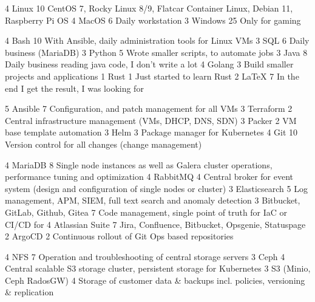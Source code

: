 \documentclass[11pt,a4paper,sans,final]{moderncv}
\begin{document}
							{4}	{Linux}								{10}	{CentOS 7, Rocky Linux 8/9, Flatcar Container Linux, Debian 11, Raspberry Pi OS}
		\cvskillentry		{}						{4}	{MacOS}								{6}		{Daily workstation}
		\cvskillentry		{}						{3}	{Windows}							{25}	{Only for gaming}
		
						{4}	{Bash}								{10}	{With Ansible, daily administration tools for Linux VMs}
		\cvskillentry		{}						{3}	{SQL}								{6}		{Daily business (MariaDB)}
		\cvskillentry		{}						{3}	{Python}							{5}		{Wrote smaller scripts, to automate jobs}
		\cvskillentry		{}						{3}	{Java}								{8}		{Daily business reading java code, I don't write a lot}
		\cvskillentry		{}						{4}	{Golang}							{3}		{Build smaller projects and applications}
		\cvskillentry		{}						{1}	{Rust}								{1}		{Just started to learn Rust}
		\cvskillentry		{}						{2}	{\LaTeX}							{7}		{In the end I get the result, I was looking for}

						{5}	{Ansible}							{7}		{Configuration, and patch management for all VMs}
		\cvskillentry		{}						{3}	{Terraform}							{2}		{Central infrastructure management (VMs, DHCP, DNS, SDN)}
		\cvskillentry		{}						{3}	{Packer}							{2}		{VM base template automation}
		\cvskillentry		{}						{3}	{Helm}								{3}		{Package manager for Kubernetes}
		\cvskillentry		{}						{4}	{Git}								{10}	{Version control for all changes (change management)}
		
						{4}	{MariaDB}							{8}		{Single node instances as well as Galera cluster operations, performance tuning and optimization}
		\cvskillentry		{}						{4}	{RabbitMQ}							{4}		{Central broker for event system (design and configuration of single nodes or cluster)}
		\cvskillentry		{}						{3}	{Elasticsearch}						{5}		{Log management, APM, SIEM, full text search and anomaly detection}
		\cvskillentry		{}						{3}	{Bitbucket, GitLab, Github, Gitea}	{7}		{Code management, single point of truth for IaC or CI/CD for}
		\cvskillentry		{}						{4}	{Atlassian Suite}					{7}		{Jira, Confluence, Bitbucket, Opsgenie, Statuspage}
		\cvskillentry		{}						{2}	{ArgoCD}							{2}		{Continuous rollout of Git Ops based repositories}

						{4}	{NFS}								{7}		{Operation and troubleshooting of central storage servers}
		\cvskillentry		{}						{3}	{Ceph}								{4}		{Central scalable S3 storage cluster, persistent storage for Kubernetes}
		\cvskillentry		{}						{3}	{S3 (Minio, Ceph RadosGW)}			{4}		{Storage of customer data \& backups incl. policies, versioning \& replication}
		
\end{document}
